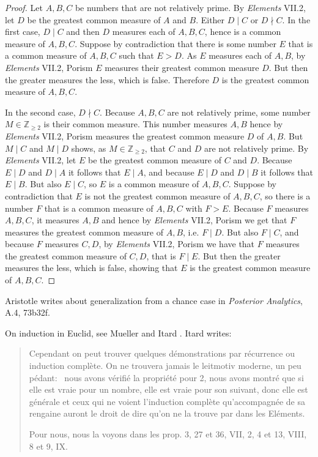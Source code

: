 \documentclass{article}
\begin{document}
\begin{proof}
Let $A,B,C$ be numbers that are not relatively prime. 
By {\em Elements} VII.2, let $D$ be the greatest common measure of $A$ and $B$.
Either $D \mid C$ or $D \nmid C$.
In the first case, $D \mid C$ and then $D$ measures each of $A,B,C$,
hence is a common measure of $A,B,C$. 
Suppose by contradiction that there is some number $E$ that is
a common measure of $A,B,C$ such that $E>D$. 
As $E$ measures each of $A,B$, by {\em Elements} VII.2, Porism $E$ measures their greatest common measure $D$.
But then the greater measures the less, which is false. Therefore $D$ is the greatest common measure of $A,B,C$.

In the second case, $D \nmid C$. Because $A,B,C$ are not relatively prime, some number $M \in \mathbb{Z}_{\geq 2}$ is their common measure. 
This number measures $A,B$ hence by {\em Elements} VII.2, Porism measures the greatest common measure $D$ of $A,B$.
But $M \mid C$ and $M \mid D$ shows, as $M \in \mathbb{Z}_{\geq 2}$, that $C$ and $D$ are not relatively prime. 
By {\em Elements} VII.2, let
 $E$ be the greatest common measure of $C$ and $D$. 
 Because $E \mid D$ and $D \mid A$ it follows that $E \mid A$, and because $E \mid D$ and $D \mid B$ it follows that $E \mid B$. 
 But also $E \mid C$, so $E$ is a common measure of $A,B,C$. Suppose by contradiction that
 $E$ is not the greatest common measure of $A,B,C$, so there is a number $F$ that is a common measure of $A,B,C$ with
 $F>E$. Because $F$ measures $A,B,C$, it measures $A,B$ and hence by {\em Elements} VII.2, Porism we get that
 $F$ measures the greatest common measure of $A,B$, i.e. $F \mid D$.
But also $F \mid C$, and because $F$ measures $C,D$, by {\em Elements} VII.2, Porism we have that
$F$ measures the greatest common measure of $C,D$, that is $F \mid E$. But then the greater measures the less, which is false, showing
that $E$ is the greatest common measure of $A,B,C$. 
\end{proof}


Aristotle writes about generalization from a chance case in {\em Posterior Analytics}, A.4, 73b32f.

On induction in Euclid, see Mueller \cite[pp.~68--69]{mueller} and  Itard \cite{itard}. Itard \cite[p.~73]{itard} writes:

\begin{quote}
Cependant on peut trouver quelques d\'emonstrations par r\'ecurrence
ou induction compl\`ete. On ne trouvera jamais le leitmotiv
moderne, un peu p\'edant: \guillemotleft\  nous avons v\'erifi\'e la propri\'et\'e pour 2,
nous avons montr\'e que si elle est vraie pour un nombre, elle est vraie
pour son suivant, donc elle est g\'en\'erale \guillemotright et ceux qui ne voient
l'induction compl\`ete qu'accompagn\'ee de sa rengaine auront le droit
de dire qu'on ne la trouve par dans les El\'ements.

Pour nous, nous la voyons dans les prop. 3, 27 et 36, VII, 2, 4 et 13, VIII, 8 et 9, IX.
\end{quote}
\end{document}
